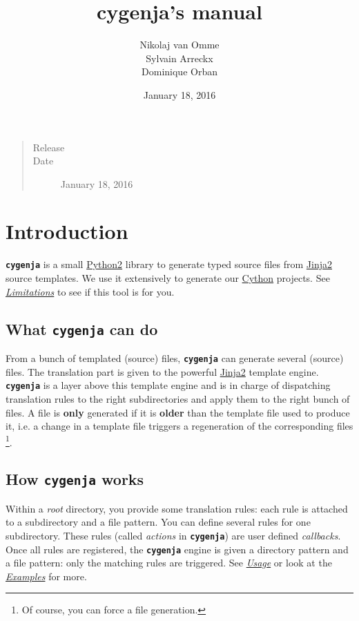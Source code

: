 \documentclass[letterpaper,10pt,english]{sphinxmanual}
\title{cygenja's manual}
\date{January 18, 2016}
\author{Nikolaj van Omme\\Sylvain Arreckx\\Dominique Orban}
\begin{document}
\maketitle
\tableofcontents
{}\label{contents::doc}

\begin{quote}\begin{description}
\item[{Release}] 

\item[{Date}] \leavevmode
January 18, 2016

\end{description}\end{quote}


\chapter{Introduction}
\label{introduction:introduction}\label{introduction:cygenja-documentation}\label{introduction::doc}\label{introduction:cygenja-introduction}
\textbf{\texttt{cygenja}} is a small \href{https://docs.python.org/2/}{Python2} library to generate typed source files from
\href{http://jinja.pocoo.org/docs/dev/}{Jinja2} source templates. We use it extensively to generate our \href{http://cython.org/}{Cython}
projects. See {\hyperref[introduction:limitations]{\emph{Limitations}}} to see if this tool
is for you.


\section{What \textbf{\texttt{cygenja}} can do}
\label{introduction:what-cygenja-can-do}
From a bunch of templated (source) files, \textbf{\texttt{cygenja}} can generate several (source) files. The translation part is given to the powerful \href{http://jinja.pocoo.org/docs/dev/}{Jinja2} template engine.
\textbf{\texttt{cygenja}} is a layer above this template engine and is in charge of dispatching translation rules to the right subdirectories and apply them to the right bunch of files. A file is \textbf{only} generated if it is \textbf{older} than
the template file used to produce it, i.e. a change in a template file triggers a regeneration of the corresponding files \footnote[1]{
Of course, you can force a file generation.
}.


\section{How \textbf{\texttt{cygenja}} works}
\label{introduction:how-cygenja-works}
Within a \emph{root} directory, you provide some translation rules: each rule is attached to a subdirectory and a file pattern. You can define several rules for one subdirectory.
These rules (called \emph{actions} in \textbf{\texttt{cygenja}}) are user defined \emph{callbacks}. Once all rules are registered, the \textbf{\texttt{cygenja}} engine
is given a directory pattern and a file pattern: only the matching rules are triggered. See {\hyperref[usage:cygenja-usage]{\emph{Usage}}} or look at the {\hyperref[examples:cygenja-examples]{\emph{Examples}}} for more.
\end{document}

